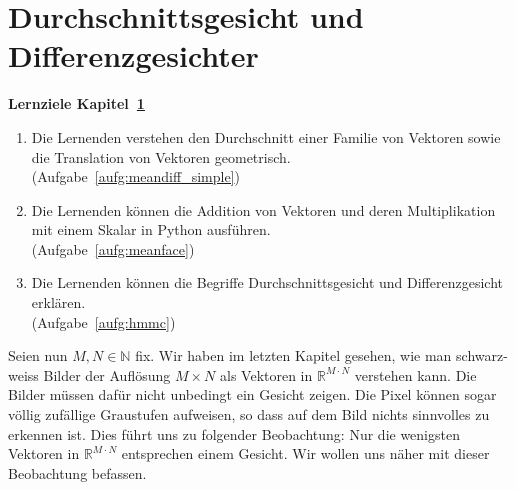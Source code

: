 \section{Durchschnittsgesicht und Differenzgesichter} \label{sec:facespace}
\begin{tcolorbox}
	\centerline{\textbf{Lernziele Kapitel~\ref{sec:facespace}}}
	\begin{enumerate}[leftmargin=*,label=\thesection.\arabic*]
		\item \label{item:meandiff_simple} Die Lernenden verstehen den Durchschnitt einer Familie von Vektoren sowie die Translation von Vektoren geometrisch.\\
		(Aufgabe~\ref{aufg:meandiff_simple})
		\item \label{item:meanface} Die Lernenden können die Addition von Vektoren und deren Multiplikation mit einem Skalar in Python ausführen.\\
		(Aufgabe~\ref{aufg:meanface})
		\item \label{item:hmmc} Die Lernenden können die Begriffe Durchschnittsgesicht und Differenzgesicht erklären.\\
		(Aufgabe~\ref{aufg:hmmc})
	\end{enumerate}
\end{tcolorbox}
Seien nun $M,N\in\mathbb N$ fix.
Wir haben im letzten Kapitel gesehen, wie man schwarz-weiss Bilder der Auflösung $M\times N$ als Vektoren in $\mathbb R^{M\cdot N}$ verstehen kann.
Die Bilder müssen dafür nicht unbedingt ein Gesicht zeigen.
Die Pixel können sogar völlig zufällige Graustufen aufweisen, so dass auf dem Bild nichts sinnvolles zu erkennen ist.
Dies führt uns zu folgender Beobachtung:
Nur die wenigsten Vektoren in $\mathbb R^{M\cdot N}$ entsprechen einem Gesicht.
Wir wollen uns näher mit dieser Beobachtung befassen.

